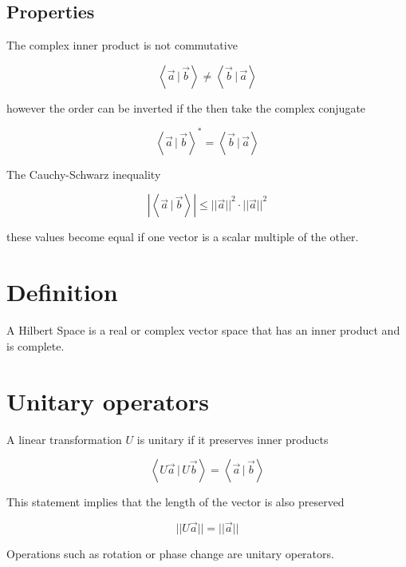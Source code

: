 \documentclass[a4paper]{article}
\newcommand{\braket}[1]{\left\langle#1\right\rangle}
\newcommand{\innerprod}[2]{\braket{#1\,|\,#2}}
\begin{document}
\subsection{Properties}

The complex inner product is not commutative

\[
    \innerprod{\vec{a}}{\vec{b}} \neq \innerprod{\vec{b}}{\vec{a}}
\]

however the order can be inverted if the then take the complex conjugate

\[
    \innerprod{\vec{a}}{\vec{b}}^{*} = \innerprod{\vec{b}}{\vec{a}}
\]

The Cauchy-Schwarz inequality

\[
    \left|\innerprod{\vec{a}}{\vec{b}}\right| \leq {||\vec{a}||}^2 \cdot {||\vec{a}||}^2
\]

these values become equal if one vector is a scalar multiple of the other.

\pagebreak

\section{Definition}

A Hilbert Space is a real or complex vector space that has an inner product and is complete.

\section{Unitary operators}

A linear transformation \(U\) is unitary if it preserves inner products

\[
    \innerprod{U\vec{a}}{U\vec{b}} = \innerprod{\vec{a}}{\vec{b}}
\]

This statement implies that the length of the vector is also preserved

\[
    ||U\vec{a}|| = ||\vec{a}||
\]

Operations such as rotation or phase change are unitary operators.

\end{document}
